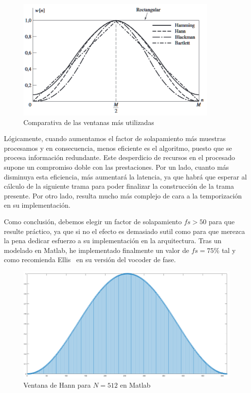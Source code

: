 \begin{figure}[!b]
\begin{center}
\includegraphics[width=10cm]{img/ventanas_grafica.png}
\caption{\label{fig:compven}Comparativa de las ventanas más utilizadas}
\end{center}
\end{figure}

Lógicamente, cuando aumentamos el factor de solapamiento más muestras procesamos y en consecuencia, menos eficiente es el algoritmo, puesto que se procesa información redundante. Este desperdicio de recursos en el procesado supone un compromiso doble con las prestaciones. Por un lado, cuanto más disminuya esta eficiencia, más aumentará la latencia, ya que habrá que esperar al cálculo de la siguiente trama para poder finalizar la construcción de la trama presente. Por otro lado, resulta mucho más complejo de cara a la temporización en su implementación. 

Como conclusión, debemos elegir un factor de solapamiento $fs > 50$ para que resulte práctico, ya que si no el efecto es demasiado sutil como para que merezca la pena dedicar esfuerzo a su implementación en la arquitectura. Tras un modelado en Matlab, he implementado finalmente un valor de $fs = 75\%$ tal y como recomienda Ellis~\cite{Ellis} en su versión del vocoder de fase.

\begin{figure}[!b]
\begin{center}
\includegraphics[width=15cm]{img/ventana_utilizada.png}
\caption{\label{fig:used_win}Ventana de Hann para $N = 512$ en Matlab}
\end{center}
\end{figure}

